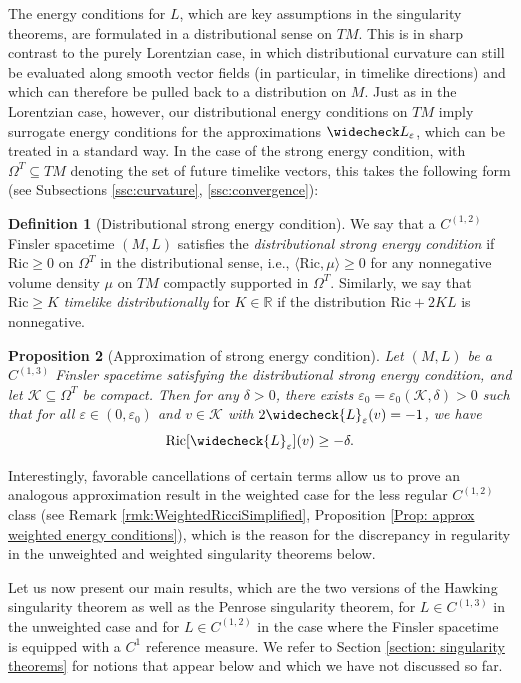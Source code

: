 \documentclass[a4paper,11pt]{article}
\numberwithin{equation}{section}
\theoremstyle{definition}
\newtheorem{Definition}{Definition}[section]
\theoremstyle{plain}
\newtheorem{Proposition}[Definition]{Proposition}
\newcommand{\R}{\mathbb R}
\newcommand{\eps}{\varepsilon}
\newcommand{\Ric}{\mathrm{Ric}}
\begin{document}
The energy conditions for $L$, which are key assumptions in the singularity theorems, are formulated in a distributional sense on $TM$. 
This is in sharp contrast to the purely Lorentzian case, in which distributional curvature can still be evaluated along smooth vector fields (in particular, in timelike directions) and which can therefore be pulled back to a distribution on $M$. 
Just as in the Lorentzian case, however, our distributional energy conditions on $TM$ imply surrogate energy conditions for the approximations $\widecheck L_\varepsilon$, which can be treated in a standard way. 
In the case of the strong energy condition, with $\Omega^T \subseteq TM$ denoting the set of future timelike vectors, this takes the following form (see Subsections \ref{ssc:curvature}, \ref{ssc:convergence}):

\begin{Definition}[Distributional strong energy condition]
We say that a $C^{(1,2)}$ Finsler spacetime $(M,L)$ satisfies the \emph{distributional strong energy condition} if $\Ric \geq 0$ on $\Omega^T$ in the distributional sense, i.e., $\langle \Ric, \mu\rangle \geq 0$ for any nonnegative volume density $\mu$ on $TM$ compactly supported in $\Omega^T$.
Similarly, we say that $\Ric \geq K$ \emph{timelike distributionally} for $K \in \R$ if the distribution $\Ric + 2 K L$ is nonnegative.
\end{Definition}

\begin{Proposition}[Approximation of strong energy condition]
    Let $(M,L)$ be a $C^{(1,3)}$ Finsler spacetime satisfying the distributional strong energy condition, and let $\mathcal{K} \subseteq \Omega^T$ be compact.
    Then for any $\delta >0$, there exists $\eps_0 =\eps_0(\mathcal{K},\delta) >0$ such that for all $\eps \in (0,\eps_0)$ and $v \in \mathcal{K}$ with $2 \widecheck{L}_\eps(v)=-1$, we have
    \begin{equation*}
        \Ric[\widecheck{L}_\eps](v) \ge - \delta.
    \end{equation*}
\end{Proposition}
Interestingly, favorable cancellations of certain terms allow us to prove an analogous approximation result in the weighted case for the less regular $C^{(1,2)}$ class (see Remark \ref{rmk:WeightedRicciSimplified}, Proposition \ref{Prop: approx weighted energy conditions}), which is the reason for the discrepancy in regularity in the unweighted and weighted singularity theorems below.

Let us now present our main results, which are the two versions of the Hawking singularity theorem as well as the Penrose singularity theorem, for $L \in C^{(1,3)}$ in the unweighted case and for $L \in C^{(1,2)}$ in the case where the Finsler spacetime is equipped with a $C^1$ reference measure. 
We refer to Section \ref{section: singularity theorems} for notions that appear below and which we have not discussed so far.
\end{document}
